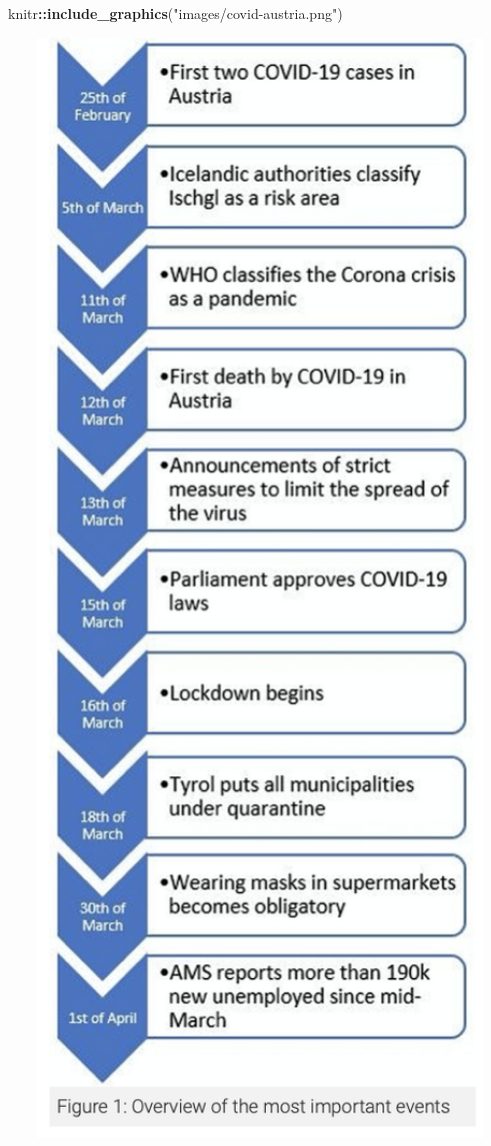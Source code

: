 \documentclass[
]{article}
\newenvironment{Shaded}{\begin{snugshade}}{\end{snugshade}}
\newcommand{\KeywordTok}[1]{\textcolor[rgb]{0.13,0.29,0.53}{\textbf{#1}}}
\newcommand{\NormalTok}[1]{#1}
\newcommand{\OperatorTok}[1]{\textcolor[rgb]{0.81,0.36,0.00}{\textbf{#1}}}
\newcommand{\StringTok}[1]{\textcolor[rgb]{0.31,0.60,0.02}{#1}}
\begin{document}
\begin{Shaded}
\begin{Highlighting}[]
\NormalTok{knitr}\OperatorTok{::}\KeywordTok{include_graphics}\NormalTok{(}\StringTok{"images/covid-austria.png"}\NormalTok{)}
\end{Highlighting}
\end{Shaded}

\includegraphics[width=5.93in]{images/covid-austria}
\end{document}
